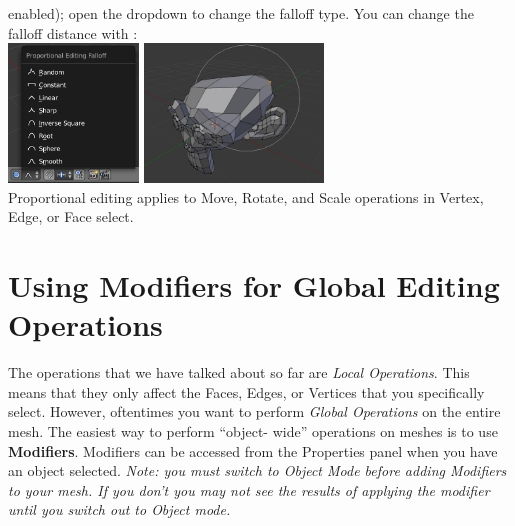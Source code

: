 \documentclass[11pt]{article}
\begin{document}
\begin{itemize}
{    enabled); open the dropdown to change the falloff type.  You can change the falloff distance
    with :\\
    \includegraphics[height=10em]{propedit-3} \includegraphics[height=10em]{propedit-4}}\\
    Proportional editing applies to Move, Rotate, and Scale operations in Vertex, Edge, or Face
    select.
\end{itemize}

\section{Using Modifiers for Global Editing Operations}

The operations that we have talked about so far are \textit{Local Operations}.  This means that they
only affect the Faces, Edges, or Vertices that you specifically select.  However, oftentimes you
want to perform \textit{Global Operations} on the entire mesh.  The easiest way to perform ``object-
wide'' operations on meshes is to use \textbf{Modifiers}.  Modifiers can be accessed from the
Properties panel when you have an object selected.  \textit{Note: you must switch to Object Mode
before adding Modifiers to your mesh.  If you don't you may not see the results of applying the
modifier until you switch out to Object mode.}
\end{document}
